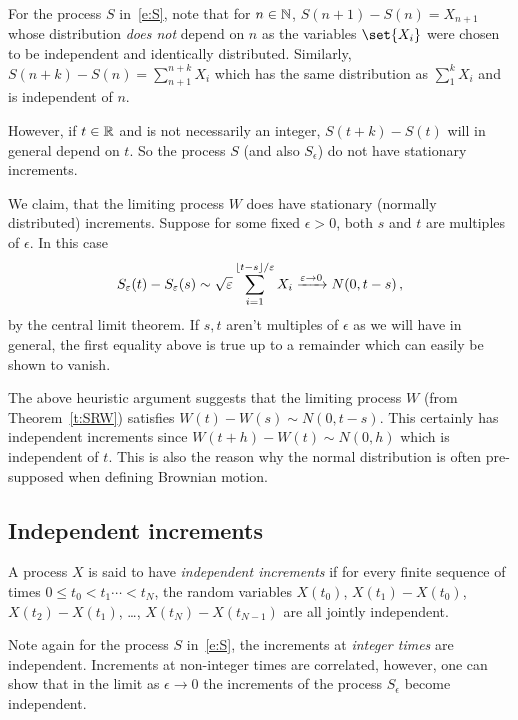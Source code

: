 For the process $S$ in~\eqref{e:S}, note that for $n \in \mathbb{N}$, $S(n+1) - S(n) = X_{n+1}$ whose distribution \emph{does not} depend on $n$ as the variables $\set{X_i}$ were chosen to be independent and identically distributed.
Similarly, $S(n+k) - S(n) = \sum_{n+1}^{n+k} X_i$ which has the same distribution as $\sum_1^{k} X_i$ and is independent of $n$.

However, if $t \in \mathbb{R}$ and is not necessarily an integer, $S(t + k) - S(t)$ will in general depend on $t$.
So the process $S$ (and also $S_\epsilon$) do not have stationary increments.

We claim, that the limiting process $W$ does have stationary (normally distributed) increments.
Suppose for some fixed $\epsilon > 0$, both $s$ and $t$ are multiples of $\epsilon$.
In this case
\begin{equation*}
  S_\varepsilon(t) - S_\varepsilon(s)
    \sim \sqrt{\varepsilon} \sum_{i=1}^{\lfloor t - s\rfloor/\varepsilon}
	X_i
    \xrightarrow{\varepsilon \to 0} N(0, t-s)\,,
\end{equation*}
by the central limit theorem.
If $s, t$ aren't multiples of $\epsilon$ as we will have in general, the first equality above is true up to a remainder which can easily be shown to vanish.

The above heuristic argument suggests that the limiting process $W$ (from Theorem~\ref{t:SRW}) satisfies $W(t) - W(s) \sim N(0, t - s)$.
This certainly has independent increments since $W(t + h) - W(t) \sim N(0, h)$ which is independent of $t$.
This is also the reason why the normal distribution is often pre-supposed when defining Brownian motion.

\subsection{Independent increments}

\begin{definition}
  A process $X$ is said to have \emph{independent increments} if for every finite sequence of times $0 \leq t_0 < t_1 \cdots < t_N$, the random variables $X(t_0)$, $X(t_1) - X(t_0)$, $X(t_2) - X(t_1)$, \dots, $X(t_N) - X(t_{N-1})$ are all jointly independent.
\end{definition}

Note again for the process $S$ in~\eqref{e:S}, the increments at \emph{integer times} are independent.
Increments at non-integer times are correlated, however, one can show that in the limit as $\epsilon \to 0$ the increments of the process $S_\epsilon$ become independent.

